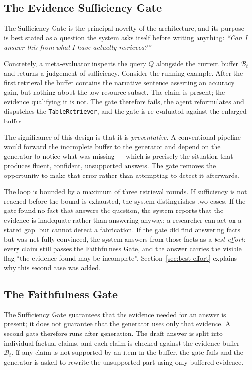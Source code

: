 \subsection{The Evidence Sufficiency Gate}

The Sufficiency Gate is the principal novelty of the architecture, and its purpose
is best stated as a question the system asks itself before writing anything:
\emph{``Can I answer this from what I have actually retrieved?''}

Concretely, a meta-evaluator inspects the query $Q$ alongside the current buffer
$\mathcal{B}_t$ and returns a judgement of sufficiency. Consider the running
example. After the first retrieval the buffer contains the narrative sentence
asserting an accuracy gain, but nothing about the low-resource subset. The claim is
present; the evidence qualifying it is not. The gate therefore fails, the agent
reformulates and dispatches the \texttt{TableRetriever}, and the gate is
re-evaluated against the enlarged buffer.

The significance of this design is that it is \emph{preventative}. A conventional
pipeline would forward the incomplete buffer to the generator and depend on the
generator to notice what was missing --- which is precisely the situation that
produces fluent, confident, unsupported answers. The gate removes the opportunity to
make that error rather than attempting to detect it afterwards.

The loop is bounded by a maximum of three retrieval rounds. If sufficiency is not
reached before the bound is exhausted, the system distinguishes two cases. If the
gate found no fact that answers the question, the system reports that the evidence
is inadequate rather than answering anyway: a researcher can act on a stated gap,
but cannot detect a fabrication. If the gate did find answering facts but was not
fully convinced, the system answers from those facts as a \emph{best effort}: every
claim still passes the Faithfulness Gate, and the answer carries the visible flag
``the evidence found may be incomplete''. Section~\ref{sec:best-effort} explains why
this second case was added.

\subsection{The Faithfulness Gate}

The Sufficiency Gate guarantees that the evidence needed for an answer is present;
it does not guarantee that the generator uses only that evidence. A second gate
therefore runs after generation. The draft answer is split into individual factual
claims, and each claim is checked against the evidence buffer $\mathcal{B}_t$. If
any claim is not supported by an item in the buffer, the gate fails and the
generator is asked to rewrite the unsupported part using only buffered evidence.

